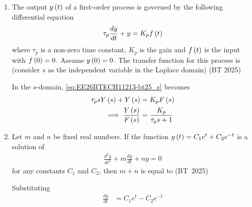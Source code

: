 \begin{enumerate}[label=\thesubsection.\arabic*, ref=\thesubsection.\theenumi,itemsep=0pt]
\begin{figure}[H]
    \label{fig:EE26BTECH11213-bt25_q42}
\end{figure}
\item The output $y\left(t\right)$ of a first-order process is governed by the following differential equation
\begin{align}
\tau_p \frac{dy}{dt} + y = K_p f\left(t\right)
    \label{eq:EE26BTECH11213-bt25_s}
\end{align}
where $\tau_p$ is a non-zero time constant, $K_p$ is the gain and $f\left(t\right)$ is the input with $f\left(0\right) = 0$.
Assume $y\left(0\right) = 0$. The transfer function for this process is (consider $s$ as the independent variable in the Laplace domain)
\hfill (BT 2025)
\begin{enumerate}[itemsep=1ex]
\end{enumerate}
\solution In the $s$-domain, 
    \eqref{eq:EE26BTECH11213-bt25_s}
    becomes
\begin{align}
\tau_p s Y\left(s\right)  + Y\left(s\right) &= K_p F\left(s\right)
\\
\implies
\frac{Y\left(s\right)}{F\left(s\right)} &= \frac{K_p}{\tau_p s + 1}
\end{align}
\item Let $m$ and $n$ be fixed real numbers. If the function $y\left(t\right) = C_1 e^t + C_2 e^{-t}$ is a solution of
\begin{align}
\frac{d^2 y}{dt^2} + m \frac{dy}{dt} + ny = 0
    \label{eq:EE26BTECH11213-bt25_int-der}
\end{align}
for any constants $C_1$ and $C_2$, then $m + n$ is equal to
\hfill (BT~2025)
\begin{enumerate}[itemsep=0pt]
\end{enumerate}
\solution
Substituting
\begin{align}
\frac{dy}{dt} &= C_1 e^t - C_2 e^{-t} \\

\end{align}
\end{enumerate}
